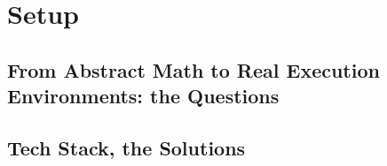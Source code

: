 \chapter{Setup}\label{ch:setup}

\section{From Abstract Math to Real Execution Environments: the Questions}


\section{Tech Stack, the Solutions}
